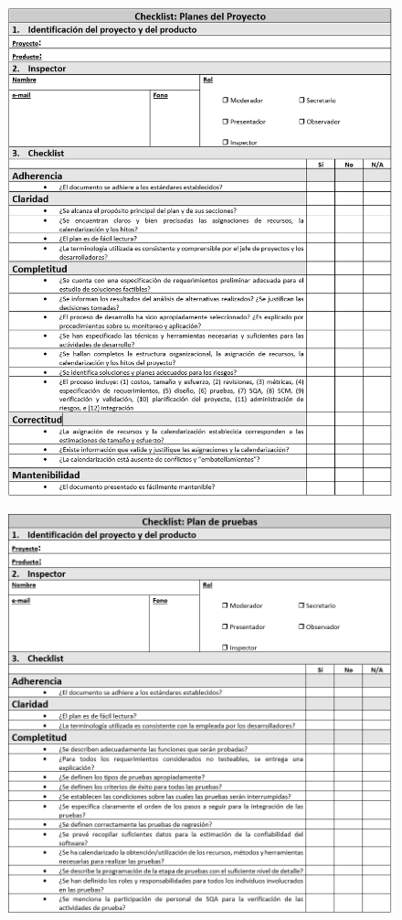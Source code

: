\begin{figure}[H]
\centering
\includegraphics[width=1\textwidth]{figures/anexos/3-2-2.PNG}
\end{figure}

\begin{figure}[H]
\centering
\includegraphics[width=1\textwidth]{figures/anexos/3-2-4a.PNG}
\end{figure}

